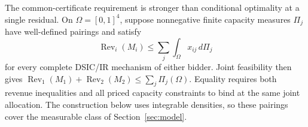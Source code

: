 The common-certificate requirement is stronger than conditional optimality
at a single residual. On $\Omega=[0,1]^4$, suppose nonnegative finite
capacity measures $\Pi_j$ have well-defined pairings and satisfy
\[
 \operatorname{Rev}_i(M_i)\le\sum_j\int_\Omega x_{ij}\,d\Pi_j
\]
for every complete DSIC/IR mechanism of either bidder. Joint feasibility
then gives $\operatorname{Rev}_1(M_1)+\operatorname{Rev}_2(M_2)\le\sum_j\Pi_j(\Omega)$. Equality requires both
revenue inequalities and all priced capacity constraints to bind at the
same joint allocation. The construction below uses integrable densities,
so these pairings cover the measurable class of Section~\ref{sec:model}.
